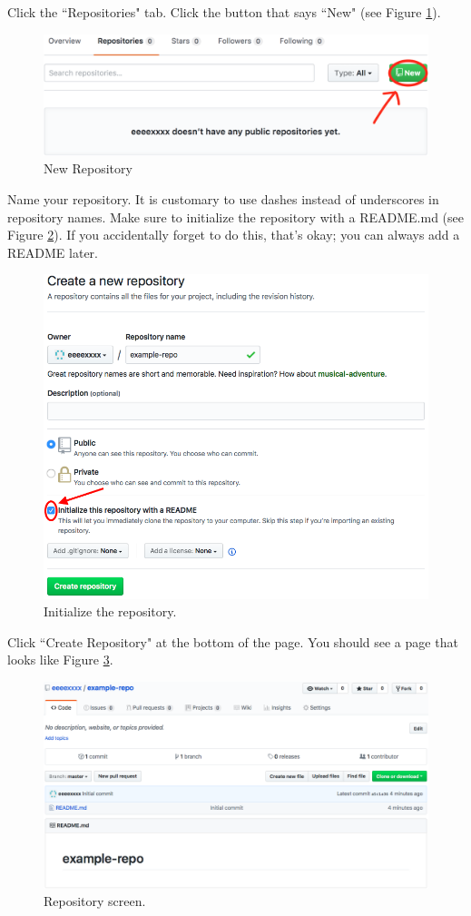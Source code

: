 \documentclass[11pt,a4paper]{article}
\begin{document}
Click the ``Repositories" tab.
Click the button that says ``New" (see Figure \ref{fig:new-repo}).

\begin{figure}[h]
\centering
\includegraphics[width=.7\textwidth]{figures/new_repo.png}
\caption{New Repository}
\label{fig:new-repo}
\end{figure}

Name your repository.
It is customary to use dashes instead of underscores in repository names.
Make sure to initialize the repository with a README.md (see Figure \ref{fig:init-repo}).
If you accidentally forget to do this, that's okay; you can always add a README later.

\begin{figure}[h]
\centering
\includegraphics[width=.7\textwidth]{figures/init_repo.png}
\caption{Initialize the repository.}
\label{fig:init-repo}
\end{figure}

Click ``Create Repository" at the bottom of the page.
You should see a page that looks like Figure \ref{fig:repo-screen}.

\begin{figure}[h]
\centering
\includegraphics[width=.7\textwidth]{figures/repo_screen.png}
\caption{Repository screen.}
\label{fig:repo-screen}
\end{figure}
\end{document}
